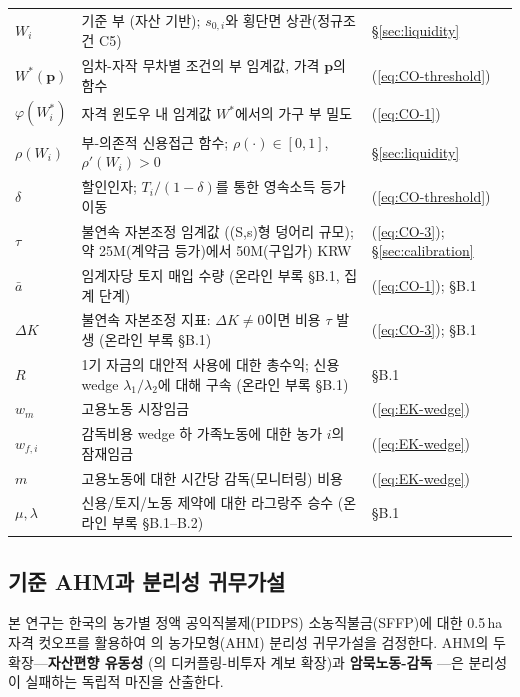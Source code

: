 \documentclass[12pt, a4paper]{article}
\begin{document}
\begin{table}[ht]
\begin{tabular}{p{2.3cm} p{8.8cm} p{2.6cm}}
$W_i$ & 기준 부 (자산 기반); $s_{0,i}$와 횡단면 상관(정규조건 C5) & \S\ref{sec:liquidity} \\
$W^*(\mathbf{p})$ & 임차-자작 무차별 조건의 부 임계값, 가격 $\mathbf{p}$의 함수 & (\ref{eq:CO-threshold}) \\
$\varphi(W_i^*)$ & 자격 윈도우 내 임계값 $W^*$에서의 가구 부 밀도 & (\ref{eq:CO-1}) \\
$\rho(W_i)$ & 부-의존적 신용접근 함수; $\rho(\cdot) \in [0,1]$, $\rho'(W_i) > 0$ & \S\ref{sec:liquidity} \\
$\delta$ & 할인인자; $T_i/(1-\delta)$를 통한 영속소득 등가 이동 & (\ref{eq:CO-threshold}) \\
$\tau$ & 불연속 자본조정 임계값 ((S,s)형 덩어리 규모); 약 25M(계약금 등가)에서 50M(구입가) KRW & (\ref{eq:CO-3}); \S\ref{sec:calibration} \\
$\bar a$ & 임계자당 토지 매입 수량 (온라인 부록 \S B.1, 집계 단계) & (\ref{eq:CO-1}); \S B.1 \\
$\Delta K$ & 불연속 자본조정 지표: $\Delta K \ne 0$이면 비용 $\tau$ 발생 (온라인 부록 \S B.1) & (\ref{eq:CO-3}); \S B.1 \\
$R$ & 1기 자금의 대안적 사용에 대한 총수익; 신용 wedge $\lambda_1/\lambda_2$에 대해 구속 (온라인 부록 \S B.1) & \S B.1 \\
$w_m$ & 고용노동 시장임금 & (\ref{eq:EK-wedge}) \\
$w_{f,i}$ & 감독비용 wedge 하 가족노동에 대한 농가 $i$의 잠재임금 & (\ref{eq:EK-wedge}) \\
$m$ & 고용노동에 대한 시간당 감독(모니터링) 비용 & (\ref{eq:EK-wedge}) \\
$\mu, \lambda$ & 신용/토지/노동 제약에 대한 라그랑주 승수 (온라인 부록 \S B.1--B.2) & \S B.1 \\
\bottomrule
\end{tabular}
\end{table}

\subsection{기준 AHM과 분리성 귀무가설}
\label{sec:ahm-baseline}

본 연구는 한국의 농가별 정액 공익직불제(PIDPS) 소농직불금(SFFP)에 대한 0.5\,ha 자격 컷오프를 활용하여 \citet{SinghSquireStrauss1986_ahm}의 농가모형(AHM) 분리성 귀무가설을 검정한다. AHM의 두 확장---\textbf{자산편향 유동성} \citep{CarterOlinto2003_liquidity}(\citealp{Kazukauskas2013_disinvestment}의 디커플링-비투자 계보 확장)과 \textbf{암묵노동-감독} \citep{EswaranKotwal1986_supervision}---은 분리성이 실패하는 독립적 마진을 산출한다.
\end{document}
